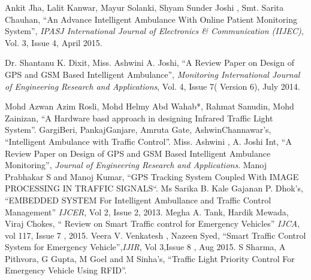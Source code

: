 \documentclass[12pt,a4paper,oneside,openright]{report}
\begin{document}
\begin{thebibliography}{29}
Ankit Jha, Lalit Kanwar, Mayur Solanki, Shyam Sunder Joshi , Smt. Sarita Chauhan, “An  Advance Intelligent Ambulance With Online Patient Monitoring System”, \textit{IPASJ    International Journal of Electronics \& Communication (IIJEC)}, Vol. 3, Issue 4, April 2015.

Dr. Shantanu  K. Dixit, Miss. Ashwini A. Joshi, “A  Review Paper on Design of GPS and GSM  Based  Intelligent Ambulance”, \textit{Monitoring  International  Journal  of  Engineering Research  and  Applications},  Vol. 4, Issue 7( Version 6), July  2014.

Mohd Azwan Azim Rosli, Mohd Helmy Abd Wahab*, Rahmat Sanudin, Mohd Zainizan, “A Hardware basd approach in designing Infrared Traffic Light System”.
GargiBeri, PankajGanjare, Amruta Gate, AshwinChannawar’s, “Intelligent Ambulance with Traffic Control”.
Miss. Ashwini , A. Joshi Int, “A Review Paper on Design of GPS and GSM Based Intelligent Ambulance Monitoring”, \textit{Journal of Engineering Research and Applications}.
Manoj Prabhakar S and Manoj Kumar, “GPS Tracking System Coupled With IMAGE PROCESSING IN TRAFFIC SIGNALS“.
Ms Sarika B. Kale Gajanan P. Dhok’s, “EMBEDDED SYSTEM For Intelligent Ambullance and Traffic Control Management” \textit{IJCER}, Vol 2, Issue 2, 2013.
Megha A. Tank, Hardik Mewada, Viraj Chokes, “ Review on Smart Traffic control for Emergency Vehicles” \textit{IJCA}, vol 117, Issue 7 , 2015.
Veera V. Venkatesh , Nazeen Syed, “Smart Traffic Control System for Emergency  Vehicle”,\textit{IJIR}, Vol 3,Issue 8 , Aug 2015.
S Sharma, A Pithvora, G Gupta, M Goel and M Sinha’s, “Traffic Light Priority Control For Emergency Vehicle Using RFID”.
\end{thebibliography}
\end{document}
